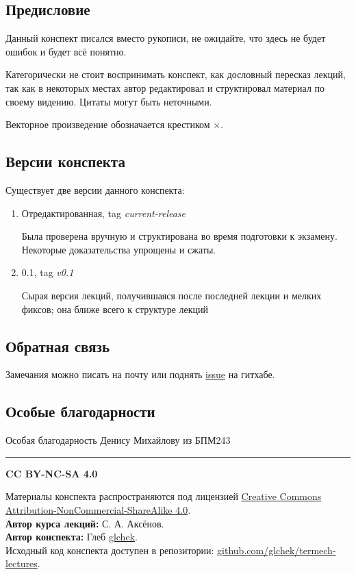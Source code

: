 \documentclass[crop=false]{standalone}
\begin{document}
\subsection{Предисловие}
Данный конспект писался вместо рукописи, не ожидайте, что здесь не будет ошибок и будет всё понятно.

Категорически не стоит воспринимать конспект, как дословный пересказ лекций, так как в некоторых местах автор редактировал и структировал материал по своему видению.
Цитаты могут быть неточными.

Векторное произведение обозначается крестиком $\times$.

\subsection*{Версии конспекта}
Существует две версии данного конспекта:
\begin{enumerate}
    \item Отредактированная, tag \emph{current-release}

    Была проверена вручную и структирована во время подготовки к экзамену. Некоторые доказательства упрощены и сжаты.
    
    \item 0.1, tag \emph{v0.1}
    
    Сырая версия лекций, получившаяся после последней лекции и мелких фиксов; она ближе всего к структуре лекций
\end{enumerate}
\subsection*{Обратная связь}
Замечания можно писать на почту или поднять \href{https://github.com/glchek/termech-lectures/issues}{issue} на гитхабе.

\subsection*{Особые благодарности}
Особая благодарность Денису Михайлову из БПМ243

\vfill
\noindent\rule{\textwidth}{0.5pt}

\begin{minipage}[b]{0.2\textwidth}
    \textbf{CC BY-NC-SA 4.0}
\end{minipage}
\hfill
\begin{minipage}[b]{0.75\textwidth}
    \footnotesize
    Материалы конспекта распространяются под лицензией \href{http://creativecommons.org/licenses/by-nc-sa/4.0/}{Creative Commons Attribution-NonCommercial-ShareAlike 4.0}. \\
    \textbf{Автор курса лекций:} С. А. Аксёнов. \\
    \textbf{Автор конспекта:} Глеб \href{https://github.com/glchek}{glchek}. \\
    Исходный код конспекта доступен в репозитории: \href{https://github.com/glchek/termech-lectures}{github.com/glchek/termech-lectures}.
\end{minipage}
\end{document}
